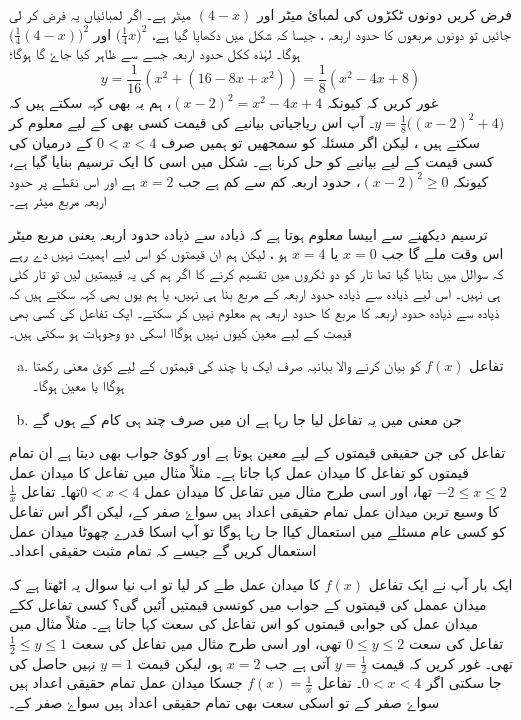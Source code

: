 فرض کریں دونوں ٹکڑوں کی لمبائ میٹر اور \(    (4-x)\) میٹر ہے۔ اگر لمبائیاں یہ فرض کر لی جائیں تو دونوں مربعوں کا حدود اربعہ ، جیسا کہ شکل  میں دکھایا گیا ہے، \(\big(\frac{1}{4}x\big)^{2}\) اور \(\big(\frac{1}{4}(4-x)\big)^{2}\) ہوگا۔ لہٰذہ ککل حدود اربعہ جسے  سے ظاہر کیا جاۓ گا ہوگا؛ 
\[y=\frac{1}{16}(x^{2}+(16-8x+x^{2}))=\frac{1}{8}(x^{2}-4x+8)\]
 غور کریں کہ کیونکہ \((x-2)^{2}=x^{2}-4x+4\)، ہم یہ بھی کہہ سکتے ہیں کہ \(y=\frac{1}{8}\big((x-2)^{2}+4\big)\)۔
آپ اس ریاجیاتی بیانیے کی قیمت کسی بھی  کے لیے معلوم کر سکتے ہیں ، لیکن اگر مسئلہ کو سمجھیں تو ہمیں صرف \(0<x<4\) کے درمیان کی کسی قیمت کے لیے بیانیے کو حل کرنا ہے۔
شکل  میں اسی کا ایک ترسیم بنایا گیا ہے، کیونکہ \((x-2)^{2}\ge0\)، حدود اربعہ کم سے کم ہے جب \(x=2\) ہے اور اس نقطے پر حدود اربعہ  مربع میٹر ہے۔

ترسیم دیکھنے سے اییسا معلوم ہوتا ہے کہ ذیادہ سے ذیادہ حدود اربعہ یعنی  مربع میٹر اس وقت ملے گا جب \(x=0\) یا \(x=4\) ہو ، لیکن ہم ان قیمتوں کو اس لیے اہمیت نہیں دے رہے کہ سوالل میں بتایا گیا تھا تار کو دو ٹکروں میں تقسیم کرنے کا اگر ہم  کی یہ قییمتیں لیں تو تار کٹی ہی نہیں۔ اس لیے ذیادہ سے ذیادہ حدود اربعہ کے مربع بنا ہی نہیں، یا ہم یوں بھی کہہ سکتے ہیں کہ ذیادہ سے ذیادہ حدود اربعہ کا مربع کا حدود اربعہ ہم معلوم نہیں کر سکتے۔
 ایک تفاعل  کی کسی بھی قیمت کے لیے معین کیوں نہیں ہوگاا اسکی دو وجوہات ہو سکتی ہیں۔
\begin{enumerate}[a.]
\item  
تفاعل \( f(x)  \) کو بیان کرنے والا ببانیہ صرف ایک یا چند  کی قیمتوں کے لیے کوئ معنی رکھتا ہوگاا یا معین ہوگا۔
\item  
جن معنی میں یہ تفاعل لیا جا رہا ہے ان میں صرف  چند  ہی کام کے ہوں گے
\end{enumerate}

تفاعل  کی جن حقیقی قیمتوں کے لیے معین ہوتا ہے اور کوئ جواب بھی دیتا ہے ان تمام قیمتوں کو تفاعل کا میدان عمل کہا جاتا ہے۔ مثلاً مثال  میں تفاعل کا میدان عمل \(-2\le x\le 2\) تھا، اور اسی طرح مثال  میں تفاعل کا میدان عمل \(0<x<4\)تھا۔ تفاعل \(\frac{1}{x}\) کا وسیع ترین میدان عمل تمام حقیقی اعداد ہیں سواۓ صفر کے، لیکن اگر اس تفاعل کو کسی عام مسئلے میں استعمال کیاا جا رہا ہوگا تو آپ اسکا قدرے چھوٹا میدان عمل استعمال کریں گے جیسے کہ تمام مثبت حقیقی اعداد۔


ایک بار آپ نے ایک تفاعل \( f(x)  \) کا میدان عمل طے کر لیا تو اب نیا سوال یہ اٹھتا ہے کہ میدان عممل کی قیمتوں کے جواب میں کونسی قیمتیں آئیں گی؟ کسی تفاعل ککے میدان عمل کی جوابی قیمتوں کو اس تفاعل کی سعت کہا جاتا ہے۔  مثلاً مثال  میں تفاعل کی سعت \(0\le y\le 2 \) تھی، اور اسی طرح مثال  میں تفاعل کی سعت \(\frac{1}{2}\le y\le 1\) تھی۔ غور کریں کہ قیمت \(y=\frac{1}{2}\) آتی ہے جب \(x=2\) ہو، لیکن قیمت \(y=1\) نہیں حاصل کی جا سکتی اگر \(0<x<4\)۔
 تفاعل \(f(x)=\frac{1}{x}\) جسکا میدان عمل تمام حقیقی اعداد ہیں سواۓ صفر کے تو اسکی سعت بھی تمام حقیقی اعداد ہیں سواۓ صفر کے۔

